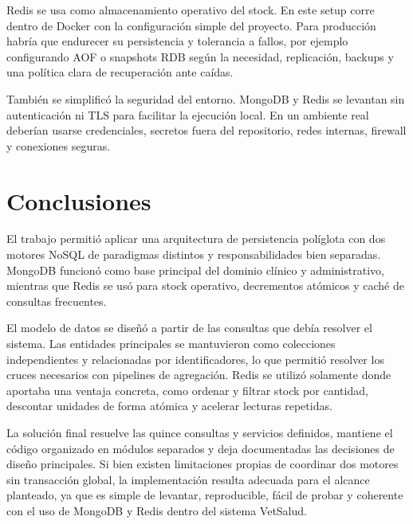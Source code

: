 \documentclass[10pt,a4paper]{article}
\let\oldsection\section
\renewcommand{\section}{\clearpage\oldsection}
\begin{document}
Redis se usa como almacenamiento operativo del stock. En este setup corre dentro de Docker con la configuración simple del proyecto. Para producción habría que endurecer su persistencia y tolerancia a fallos, por ejemplo configurando AOF o snapshots RDB según la necesidad, replicación, backups y una política clara de recuperación ante caídas.

También se simplificó la seguridad del entorno. MongoDB y Redis se levantan sin autenticación ni TLS para facilitar la ejecución local. En un ambiente real deberían usarse credenciales, secretos fuera del repositorio, redes internas, firewall y conexiones seguras.

\section{Conclusiones}

El trabajo permitió aplicar una arquitectura de persistencia políglota con dos motores NoSQL de paradigmas distintos y responsabilidades bien separadas. MongoDB funcionó como base principal del dominio clínico y administrativo, mientras que Redis se usó para stock operativo, decrementos atómicos y caché de consultas frecuentes.

El modelo de datos se diseñó a partir de las consultas que debía resolver el sistema. Las entidades principales se mantuvieron como colecciones independientes y relacionadas por identificadores, lo que permitió resolver los cruces necesarios con pipelines de agregación. Redis se utilizó solamente donde aportaba una ventaja concreta, como ordenar y filtrar stock por cantidad, descontar unidades de forma atómica y acelerar lecturas repetidas.

La solución final resuelve las quince consultas y servicios definidos, mantiene el código organizado en módulos separados y deja documentadas las decisiones de diseño principales. Si bien existen limitaciones propias de coordinar dos motores sin transacción global, la implementación resulta adecuada para el alcance planteado, ya que es simple de levantar, reproducible, fácil de probar y coherente con el uso de MongoDB y Redis dentro del sistema VetSalud.
\end{document}
